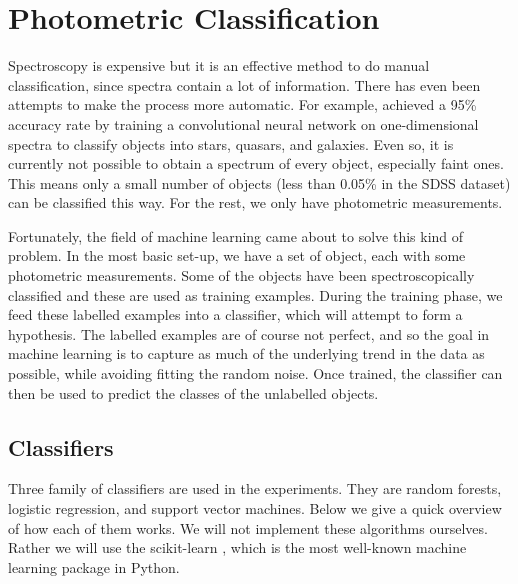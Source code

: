 

\chapter{Photometric Classification}
\label{cha:ml}

Spectroscopy is expensive but it is an effective method to do manual classification,
since spectra contain a lot of information. There has even been attempts to make the process
more automatic. For example,  achieved a 95\% accuracy rate by training
a convolutional neural network on one-dimensional spectra to classify objects
into stars, quasars, and galaxies. Even so, it is currently not possible to obtain
a spectrum of every object, especially faint ones. This means only a small number of objects
(less than 0.05\% in the SDSS dataset) can be classified this way. For the rest,
we only have photometric measurements.

Fortunately, the field of machine learning came about to solve this kind of problem.
In the most basic set-up, we have a set of object, each with some photometric measurements.
Some of the objects have been spectroscopically classified and these are used as training
examples. During the training phase, we feed these labelled examples into a classifier,
which will attempt to form a hypothesis. The labelled examples are of course not perfect, and so
the goal in machine learning is to capture as much of the underlying trend in the data as possible,
while avoiding fitting the random noise. Once trained, the classifier can then
be used to predict the classes of the unlabelled objects.

\section{Classifiers}
\label{sec:machine}
Three family of classifiers are used in the experiments. They are random forests,
logistic regression, and support vector machines. Below we give a quick overview of how
each of them works. We will not implement these algorithms ourselves. Rather we will use
the scikit-learn \cite{pedregosa11}, which is the most well-known machine learning package
in Python. 

